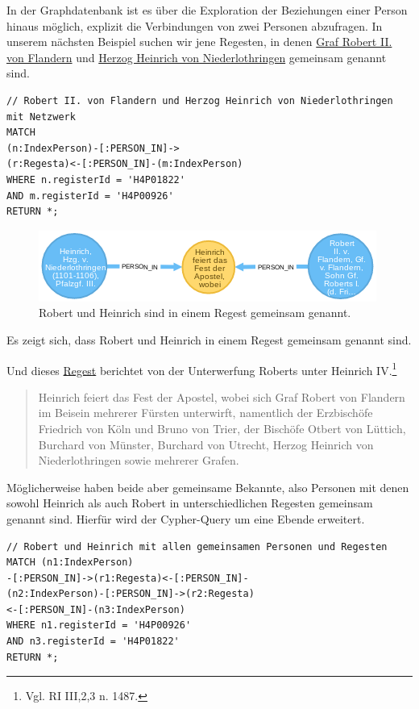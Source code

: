 \documentclass[ngerman,]{scrreprt}
\begin{document}
In der Graphdatenbank ist es über die Exploration der Beziehungen einer Person hinaus möglich, explizit die Verbindungen von zwei Personen abzufragen. In unserem nächsten Beispiel suchen wir jene Regesten, in denen \href{https://de.wikipedia.org/wiki/Robert_II._(Flandern)}{Graf Robert II. von Flandern} und \href{https://de.wikipedia.org/wiki/Heinrich_I._(Limburg)}{Herzog Heinrich von Niederlothringen} gemeinsam genannt sind.

\begin{verbatim}
// Robert II. von Flandern und Herzog Heinrich von Niederlothringen mit Netzwerk
MATCH
(n:IndexPerson)-[:PERSON_IN]->
(r:Regesta)<-[:PERSON_IN]-(m:IndexPerson)
WHERE n.registerId = 'H4P01822'
AND m.registerId = 'H4P00926'
RETURN *;
\end{verbatim}

\begin{figure}
\centering
\includegraphics{Bilder/RI2Graph/RobertundHeinrich.png}
\caption{Robert und Heinrich sind in einem Regest gemeinsam genannt.}
\end{figure}

Es zeigt sich, dass Robert und Heinrich in einem Regest gemeinsam genannt sind.

Und dieses \href{http://www.regesta-imperii.de/id/cf75356b-bd0d-4a67-8aeb-3ae27d1dcefa}{Regest} berichtet von der Unterwerfung Roberts unter Heinrich IV.\footnote{Vgl. RI III,2,3 n. 1487.}

\begin{quote}
Heinrich feiert das Fest der Apostel, wobei sich Graf Robert von Flandern im Beisein mehrerer Fürsten unterwirft, namentlich der Erzbischöfe Friedrich von Köln und Bruno von Trier, der Bischöfe Otbert von Lüttich, Burchard von Münster, Burchard von Utrecht, Herzog Heinrich von Niederlothringen sowie mehrerer Grafen.
\end{quote}

Möglicherweise haben beide aber gemeinsame Bekannte, also Personen mit denen sowohl Heinrich als auch Robert in unterschiedlichen Regesten gemeinsam genannt sind. Hierfür wird der Cypher-Query um eine Ebende erweitert.

\begin{verbatim}
// Robert und Heinrich mit allen gemeinsamen Personen und Regesten
MATCH (n1:IndexPerson)
-[:PERSON_IN]->(r1:Regesta)<-[:PERSON_IN]-
(n2:IndexPerson)-[:PERSON_IN]->(r2:Regesta)
<-[:PERSON_IN]-(n3:IndexPerson)
WHERE n1.registerId = 'H4P00926'
AND n3.registerId = 'H4P01822'
RETURN *;
\end{verbatim}
\end{document}
